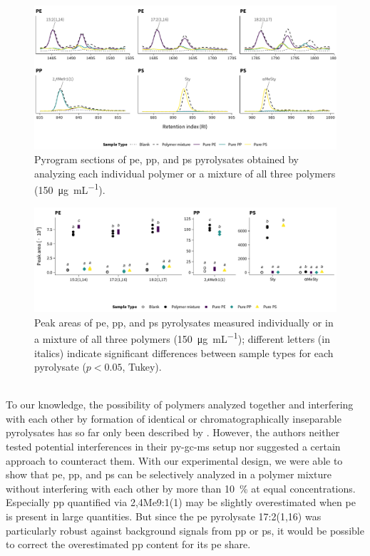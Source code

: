 \begin{figure}[t]
	\centering
	\includegraphics[width=\textwidth]{figures/py-selectivity1}
	\caption[Pyrogram sections of \ac{pe}, \ac{pp}, and \ac{ps} pyrolysates.]{Pyrogram sections of \ac{pe}, \ac{pp}, and \ac{ps} pyrolysates obtained by analyzing each individual polymer or a mixture of all three polymers (\SI{150}{\micro\gram\per\milli\liter}).}
	\label{fig:py-selectivity1}
	\forceversofloat
\end{figure}

\begin{figure}[b]
	\centering
	\includegraphics[width=\textwidth]{figures/py-selectivity2}
	\caption[Peak areas of \ac{pe}, \ac{pp}, and \ac{ps} pyrolysates.]{Peak areas of \ac{pe}, \ac{pp}, and \ac{ps} pyrolysates measured individually or in a mixture of all three polymers (\SI{150}{\micro\gram\per\milli\liter}); different letters (in italics) indicate significant differences between sample types for each pyrolysate ($p < 0.05$, Tukey).\\~}
	\label{fig:py-selectivity2}
	\forceversofloat
\end{figure}

To our knowledge, the possibility of polymers analyzed together and interfering with each other by formation of identical or chromatographically inseparable pyrolysates has so far only been described by \citet{FischerSimultaneous2017}. However, the authors neither tested potential interferences in their \ac{py-gc-ms} setup nor suggested a certain approach to counteract them. With our experimental design, we were able to show that \ac{pe}, \ac{pp}, and \ac{ps} can be selectively analyzed in a polymer mixture without interfering with each other by more than \SI{10}{\percent} at equal concentrations. Especially \ac{pp} quantified via 2,4Me9:1(1) may be slightly overestimated when \ac{pe} is present in large quantities. But since the \ac{pe} pyrolysate 17:2(1,16) was particularly robust against background signals from \ac{pp} or \ac{ps}, it would be possible to correct the overestimated \ac{pp} content for its \ac{pe} share.

